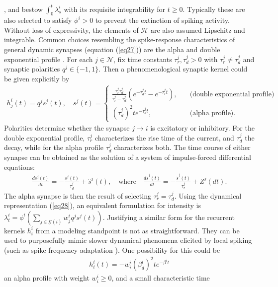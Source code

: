 \documentclass[12pt, oneside]{report}
\newcommand{\1}[1]{\mathbbm{1}_{\{#1\}}}
\newcommand{\mc}[1]{\mathcal{#1}}
\theoremstyle{definition}
\begin{document}
\cite{Hodgkin_1948}, \cite{Izhikevich_2007} and bestow $\int_0^t\lambda^i_s$
with its requisite integrability for $t\geq 0$. Typically these are also
selected to satisfy $\phi^i>0$ to prevent the extinction of spiking activity.
Without loss of expressivity, the elements of $\mc{H}$ are also assumed
Lipschitz and integrable. Common choices resembling the spike-response
characteristics of general dynamic synapses (equation (\ref{eq27})) are the
alpha and double exponential profile \cite{Ermentrout_Terman_2010}. For each
$j\in\mc{N}$, fix time constants $\tau^j_r,\tau^j_d>0$ with $\tau^j_r\neq
\tau^j_d$ and synaptic polarities $q^j\in\{-1,1\}$. Then a phenomenological
synaptic kernel could be given explicitly by
\begin{align}
    h^i_j(t)=q^js^j(t),\quad s^j(t)=\begin{cases}
        \frac{\tau^j_r\tau^j_d}{\tau^j_r-\tau^j_d}(e^{-\tau^j_dt}-e^{-\tau^j_rt}),\quad&\text{(double exponential profile)}\\
        (\tau^j_d)^2te^{-\tau^j_dt},\quad&\text{(alpha profile)}.
    \end{cases}\label{eq14}
\end{align}
Polarities determine whether the synapse $j\rightarrow i$ is excitatory or
inhibitory. For the double exponential profile, $\tau^j_r$ characterizes the
rise time of the current, and $\tau^j_d$ the decay, while for the alpha profile
$\tau^j_d$ characterizes both. The time course of either synapse can be obtained
as the solution of a system of impulse-forced differential equations:
\begin{align}
    \frac{ds^j(t)}{dt}=-\frac{s^j(t)}{\tau^j_d}+\hat{s}^j(t),\quad\text{where}\quad
    \frac{d\tilde{s}^j(t)}{dt}=-\frac{\tilde{s}^j(t)}{\tau^j_r}+Z^j(dt).\label{eq28}
\end{align}
The alpha synapse is then the result of selecting $\tau^j_r=\tau^j_d$. Using the
dynamical representation (\ref{eq28}), an equivalent formulation for intensity
is $\lambda^i_t=\phi^i(\sum_{j\in\mc{G}(i)}w^i_jq^js^j(t))$. Justifying a
similar form for the recurrent kernels $h^i_i$ from a modeling standpoint is not
as straightforward. They can be used to purposefully mimic slower dynamical
phenomena elicited by local spiking (such as spike frequency adaptation
\cite{Kistler_Gerstner_Hemmen_1997}). One possibility for this could be
\begin{align}
    h^i_i(t)=-w^i_i(\beta^i_d)^2te^{-\beta^it}\label{eq15}
\end{align}
an alpha profile with weight $w^i_i\geq 0$, and a small characteristic time
\end{document}
